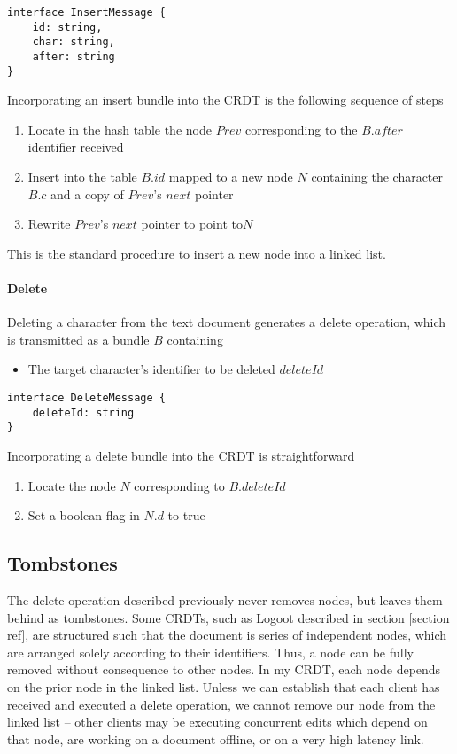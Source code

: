 \documentclass[12pt,a4paper,twoside,openright]{report}
\begin{document}
\vspace{3mm}	
\begin{lstlisting}[caption=Insert Bundle Type Signature]
interface InsertMessage {
    id: string,
    char: string,
    after: string
}
\end{lstlisting}
				
				Incorporating an insert bundle into the CRDT is the following sequence of steps
				\begin{enumerate}
					\item Locate in the hash table the node $Prev$ corresponding to the $B.after$ identifier received
					\item Insert into the table $B.id$ mapped to a new node $N$ containing the character $B.c$ and a copy of $Prev$'s $next$ pointer
					\item Rewrite $Prev$'s $next$ pointer to point to$N$
				\end{enumerate}
				This is the standard procedure to insert a new node into a linked list.
				
			\paragraph{Delete}
				Deleting a character from the text document generates a delete operation, which is transmitted as a bundle $B$ containing
				\begin{itemize}
					\item The target character's identifier to be deleted $deleteId$
				\end{itemize}
				
\vspace{3mm}
\begin{lstlisting}[caption=Delete Bundle Type Signature]
interface DeleteMessage {
    deleteId: string
}
\end{lstlisting}				
				
				Incorporating a delete bundle into the CRDT is straightforward
				\begin{enumerate}
					\item Locate the node $N$ corresponding to $B.deleteId$
					\item Set a boolean flag in $N.d$ to true
				\end{enumerate}
				
		\subsection{Tombstones}
			The delete operation described previously never removes nodes, but leaves them behind as tombstones. Some CRDTs, such as Logoot described in section [section ref], are structured such that the document is series of independent nodes, which are arranged solely according to their identifiers. Thus, a node can be fully removed without consequence to other nodes. In my CRDT, each node depends on the prior node in the linked list. Unless we can establish that each client has received and executed a delete operation, we cannot remove our node from the linked list -- other clients may be executing concurrent edits which depend on that node, are working on a document offline, or on a very high latency link.
			
\end{document}
